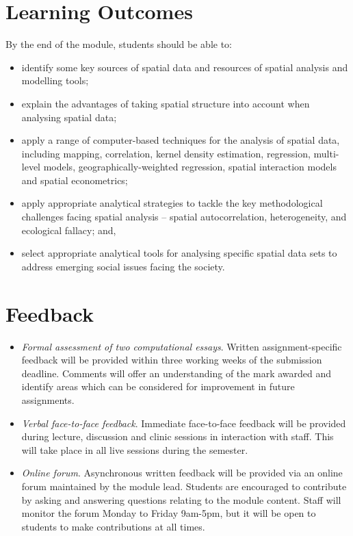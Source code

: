 \documentclass[
]{book}
\providecommand{\tightlist}{%
  \setlength{\itemsep}{0pt}\setlength{\parskip}{0pt}}
\begin{document}
\hypertarget{learning-outcomes}{%
\section{Learning Outcomes}\label{learning-outcomes}}

By the end of the module, students should be able to:

\begin{itemize}
\tightlist
\item
  identify some key sources of spatial data and resources of spatial analysis and modelling tools;
\item
  explain the advantages of taking spatial structure into account when analysing spatial data;
\item
  apply a range of computer-based techniques for the analysis of spatial data, including mapping, correlation, kernel density estimation, regression, multi-level models, geographically-weighted regression, spatial interaction models and spatial econometrics;
\item
  apply appropriate analytical strategies to tackle the key methodological challenges facing spatial analysis -- spatial autocorrelation, heterogeneity, and ecological fallacy; and,
\item
  select appropriate analytical tools for analysing specific spatial data sets to address emerging social issues facing the society.
\end{itemize}

\hypertarget{feedback}{%
\section{Feedback}\label{feedback}}

\begin{itemize}
\item
  \emph{Formal assessment of two computational essays}. Written assignment-specific feedback will be provided within three working weeks of the submission deadline. Comments will offer an understanding of the mark awarded and identify areas which can be considered for improvement in future assignments.
\item
  \emph{Verbal face-to-face feedback}. Immediate face-to-face feedback will be provided during lecture, discussion and clinic sessions in interaction with staff. This will take place in all live sessions during the semester.
\item
  \emph{Online forum}. Asynchronous written feedback will be provided via an online forum maintained by the module lead. Students are encouraged to contribute by asking and answering questions relating to the module content. Staff will monitor the forum Monday to Friday 9am-5pm, but it will be open to students to make contributions at all times.
\end{itemize}
\end{document}
